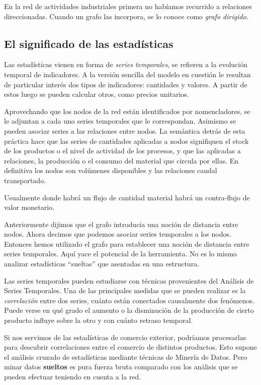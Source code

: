 \documentclass[a4paper]{report}
\begin{document}
En la red de actividades industriales primera no habíamos recurrido a relaciones direccionadas. Cuando un grafo las incorpora, se lo conoce como \textit{grafo dirigido}.

\subsection*{El significado de las estadísticas}

Las estadísticas vienen en forma de \textit{series temporales}, se refieren a la evolución temporal de indicadores. A la versión sencilla del modelo en cuestión le resultan de particular interés dos tipos de indicadores: cantidades y valores. A partir de estos luego se pueden calcular otros, como precios unitarios.

Aprovechando que los nodos de la red están identificados por nomencladores, se le adjuntan a cada uno series temporales que le correspondan. Asimismo se pueden asociar series a las relaciones entre nodos. La semántica detrás de esta práctica hace que las series de cantidades aplicadas a nodos signifiquen el stock de los productos o el nivel de actividad de los procesos, y que las aplicadas a relaciones, la producción o el consumo del material que circula por ellas. En definitiva los nodos son volúmenes disponibles y las relaciones caudal transportado.

Usualmente donde habrá un flujo de cantidad material habrá un contra-flujo de valor monetario.

Anteriormente dijimos que el grafo introducía una noción de distancia entre nodos. Ahora decimos que podemos asociar series temporales a los nodos. Entonces hemos utilizado el grafo para establecer una noción de distancia entre series temporales. Aquí yace el potencial de la herramienta. No es lo mismo analizar estadísticas ``sueltas'' que asentadas en una estructura.

Las series temporales pueden estudiarse con técnicas provenientes del Análisis de Series Temporales. Una de las principales medidas que se pueden realizar es la \textit{correlación} entre dos series, cuánto están conectados causalmente dos fenómenos. Puede verse en qué grado el aumento o la disminución de la producción de cierto producto influye sobre la otro y con cuánto retraso temporal.

Si nos servimos de las estadísticas de comercio exterior, podríamos procesarlas para descubrir correlaciones entre el comercio de distintos productos. Esto supone el análisis cruzado de estadísticas mediante técnicas de Minería de Datos. Pero minar datos \textbf{sueltos} es pura fuerza bruta comparado con los análisis que se pueden efectuar teniendo en cuenta a la red.
\end{document}
